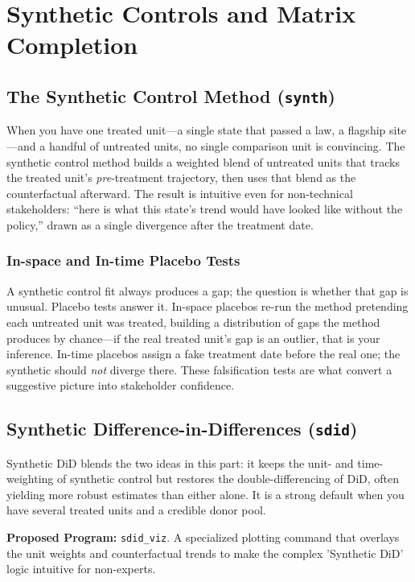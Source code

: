 \documentclass[
    a4paper,
    fontsize=10pt,
    twoside=true,
    numbers=noenddot,
]{kaobook}
\begin{document}
\chapter{Synthetic Controls and Matrix Completion}
\section{The Synthetic Control Method (\texttt{synth})}
When you have one treated unit---a single state that passed a law, a flagship site---and a handful of untreated units, no single comparison unit is convincing. The synthetic control method builds a weighted blend of untreated units that tracks the treated unit's \emph{pre}-treatment trajectory, then uses that blend as the counterfactual afterward. The result is intuitive even for non-technical stakeholders: \enquote{here is what this state's trend would have looked like without the policy,} drawn as a single divergence after the treatment date.

\subsection{In-space and In-time Placebo Tests}
A synthetic control fit always produces a gap; the question is whether that gap is unusual. Placebo tests answer it. In-space placebos re-run the method pretending each untreated unit was treated, building a distribution of gaps the method produces by chance---if the real treated unit's gap is an outlier, that is your inference. In-time placebos assign a fake treatment date before the real one; the synthetic should \emph{not} diverge there. These falsification tests are what convert a suggestive picture into stakeholder confidence.

\section{Synthetic Difference-in-Differences (\texttt{sdid})}
Synthetic DiD blends the two ideas in this part: it keeps the unit- and time-weighting of synthetic control but restores the double-differencing of DiD, often yielding more robust estimates than either alone. It is a strong default when you have several treated units and a credible donor pool.

\begin{kaobox}[frametitle=Ado-file Idea: \texttt{sdid\_viz}]
\textbf{Proposed Program:} \texttt{sdid\_viz}. A specialized plotting command that overlays the unit weights and counterfactual trends to make the complex 'Synthetic DiD' logic intuitive for non-experts.
\end{kaobox}
\end{document}
